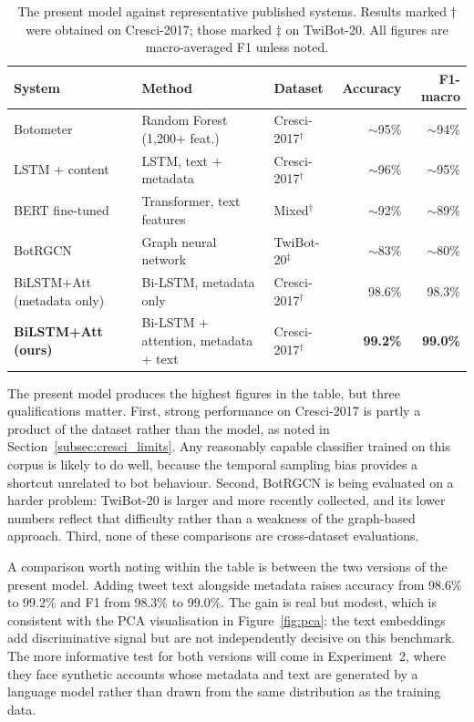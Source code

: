 \begin{table}[h]
\centering
\small
\caption{The present model against representative published systems.
  Results marked $\dagger$ were obtained on Cresci-2017; those marked
  $\ddagger$ on TwiBot-20. All figures are macro-averaged F1 unless noted.}
\label{tab:sota}
\begin{tabular}{lllrr}
\hline
\textbf{System} & \textbf{Method} & \textbf{Dataset} &
  \textbf{Accuracy} & \textbf{F1-macro} \\
\hline
Botometer~\cite{VFD+17}      & Random Forest (1{,}200+ feat.) & Cresci-2017$^\dagger$ & $\sim$95\% & $\sim$94\% \\
LSTM + content~\cite{AZS+23} & LSTM, text + metadata          & Cresci-2017$^\dagger$ & $\sim$96\% & $\sim$95\% \\
BERT fine-tuned~\cite{AZS+23}& Transformer, text features     & Mixed$^\dagger$       & $\sim$92\% & $\sim$89\% \\
BotRGCN~\cite{FTLL21}        & Graph neural network           & TwiBot-20$^\ddagger$  & $\sim$83\% & $\sim$80\% \\
\hline
BiLSTM+Att (metadata only)   & Bi-LSTM, metadata only         & Cresci-2017$^\dagger$ & 98.6\%  & 98.3\% \\
\textbf{BiLSTM+Att (ours)}   & Bi-LSTM + attention, metadata + text & Cresci-2017$^\dagger$ &
  \textbf{99.2\%} & \textbf{99.0\%} \\
\hline
\end{tabular}
\end{table}

The present model produces the highest figures in the table, but three
qualifications matter. First, strong performance on Cresci-2017 is partly a
product of the dataset rather than the model, as noted in
Section~\ref{subsec:cresci_limits}. Any reasonably capable classifier trained
on this corpus is likely to do well, because the temporal sampling bias
provides a shortcut unrelated to bot behaviour. Second, BotRGCN is being
evaluated on a harder problem: TwiBot-20 is larger and more recently
collected, and its lower numbers reflect that difficulty rather than a
weakness of the graph-based approach. Third, none of these comparisons are
cross-dataset evaluations.

A comparison worth noting within the table is between the two versions of
the present model. Adding tweet text alongside metadata raises accuracy from
98.6\% to 99.2\% and F1 from 98.3\% to 99.0\%. The gain is real but
modest, which is consistent with the PCA visualisation in
Figure~\ref{fig:pca}: the text embeddings add discriminative signal but
are not independently decisive on this benchmark. The more informative test
for both versions will come in Experiment~2, where they face synthetic
accounts whose metadata and text are generated by a language model rather
than drawn from the same distribution as the training data.

